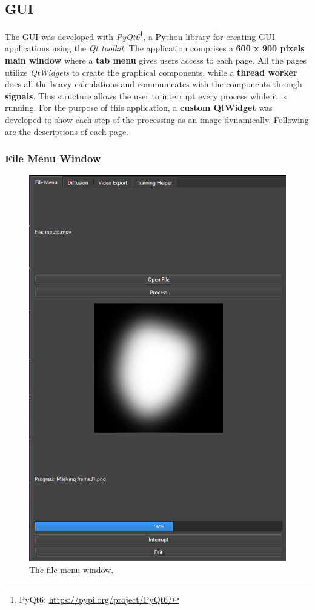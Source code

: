 \documentclass[preprint]{elsarticle}
\begin{document}
\subsection{GUI} \label{sec:gui}
The GUI was developed with \emph{PyQt6}\footnote{PyQt6: \url{https://pypi.org/project/PyQt6/}}, 
a Python library for creating GUI applications using the \emph{Qt toolkit}. 
The application comprises a \textbf{600 x 900 pixels main window} where a \textbf{tab menu} gives users access to each page.
All the pages utilize \emph{QtWidgets} to create the graphical components, 
while a \textbf{thread worker} does all the heavy calculations and communicates 
with the components through \textbf{signals}. 
This structure allows the user to interrupt every process while it is running.
For the purpose of this application, a \textbf{custom QtWidget} 
was developed to show each step of the processing as an image dynamically. 
Following are the descriptions of each page.
\subsubsection{File Menu Window}

\begin{figure}[H]
	\centering
	\includegraphics[scale=0.5, keepaspectratio]{img/project_img/file-window.png}
	\caption{The file menu window.}
	\label{fig:file-menu}
\end{figure}
\end{document}
